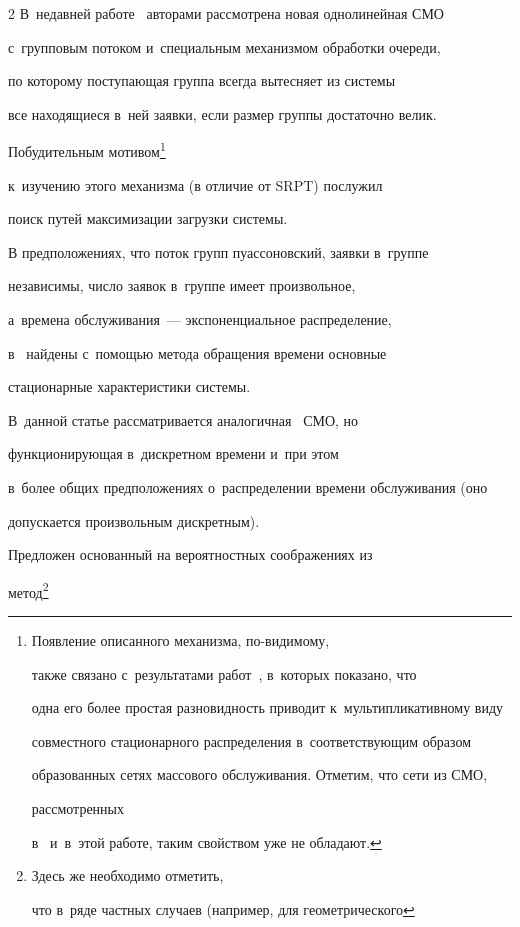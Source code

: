 \begin{multicols}{2}
В~недавней работе~\cite{i1} авторами рассмотрена новая однолинейная СМО 


с~групповым потоком и~специальным механизмом обработки очереди,


по которому поступающая группа всегда вытесняет из системы


все находящиеся в~ней заявки, если размер группы достаточно велик.


Побудительным мотивом\footnote[3]{Появление описанного механизма, по-видимому,


также связано с~результатами работ~\cite{i7,i8}, в~которых показано, что


одна его более простая разновидность приводит к~мультипликативному виду


совместного стационарного распределения в~соответствующим образом


образованных сетях массового обслуживания. Отметим, что сети из СМО, 


рассмотренных


в~\cite{i1} и~в~этой работе, таким свойством уже не обладают.}


к~изучению этого механизма (в отличие от SRPT) послужил


поиск путей максимизации загрузки системы.





В предположениях, что поток групп пуассоновский, заявки в~группе


независимы, число заявок в~группе имеет произвольное,


а~времена обслуживания~--- экспоненциальное распределение,


в~\cite{i1} найде\-ны с~помощью метода обращения времени основные 


стационарные характеристики сис\-те\-мы.


В~данной статье рассматривается аналогичная~\cite{i1} СМО, но 


функционирующая в~дискретном времени и~при этом


в~более общих предположениях о~распределении времени обслуживания (оно 


допускается произвольным дискретным).


Предложен основанный на вероятностных соображениях из~\cite{n4}


метод\footnote[4]{Здесь же необходимо отметить,


что в~ряде частных случаев (например, для геометрического


}
\end{multicols}
